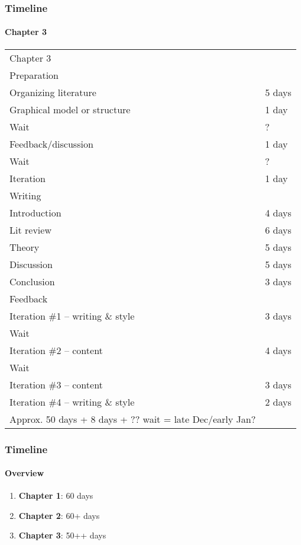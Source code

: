 \begin{frame}
	\frametitle{Timeline}
	\framesubtitle{Chapter 3}
	\tiny
	\begin{tabular}{ l l }
		Chapter 3 & \\
		Preparation													& \\
		\tabindent Organizing literature							& 5 days\\
		\tabindent Graphical model or structure						& 1 day	\\
		\tabindent Wait												& ?	\\
		\tabindent Feedback/discussion								& 1 day \\
		\tabindent Wait												& ? \\
		\tabindent Iteration										& 1 day \\
		Writing														& \\
		\tabindent Introduction										& 4 days\\
		\tabindent Lit review										& 6 days\\
		\tabindent Theory											& 5 days\\
		\tabindent Discussion										& 5 days\\
		\tabindent Conclusion										& 3 days\\	
		Feedback													& \\	
		\tabindent Iteration \#1 -- writing \& style				& 3 days\\
		\tabindent Wait												& \\
		\tabindent Iteration \#2 -- content							& 4 days\\
		\tabindent Wait												& \\
		\tabindent Iteration \#3 -- content							& 3 days\\
		\tabindent Iteration \#4 -- writing \& style				& 2 days\\
		\hline
		Approx. 50 days + 8 days + ?? wait = late Dec/early Jan?
	\end{tabular}
\end{frame}

\begin{frame}
	\frametitle{Timeline}
	\framesubtitle{Overview}
	\begin{enumerate}
		\item \textbf{Chapter 1}: 60 days
		\item \textbf{Chapter 2}: 60+ days
		\item \textbf{Chapter 3}: 50++ days		
	\end{enumerate}
\end{frame}